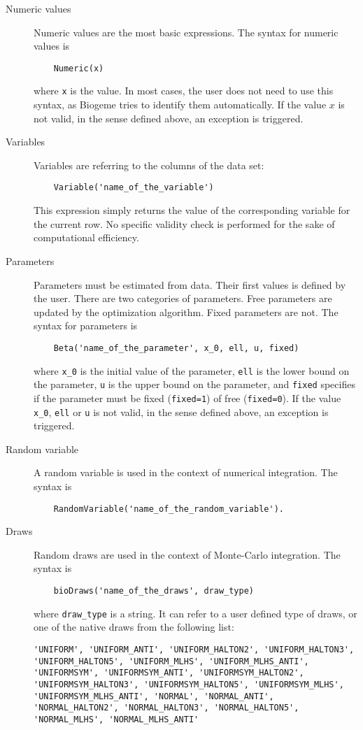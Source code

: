 \documentclass[12pt,a4paper]{article}
\begin{document}
\begin{description}
\item[Numeric values] Numeric values are the most basic expressions. The syntax for numeric values is
  \begin{lstlisting}
    Numeric(x)
  \end{lstlisting}
  where \lstinline+x+ is the value. In most cases, the user does not need to use this syntax, as Biogeme tries to identify them automatically.
  If the value $x$ is not valid, in the sense defined above, an exception is triggered.
\item[Variables] Variables are referring to the columns of the data set:
  \begin{lstlisting}
    Variable('name_of_the_variable')
  \end{lstlisting}
  This expression simply returns the value of the corresponding variable for the current row. No specific validity check is performed for the sake of computational efficiency.
\item[Parameters] Parameters must be estimated from data. Their first values is defined by the user. There are two categories of parameters. Free parameters are updated by the optimization algorithm.
  Fixed parameters are not.
  The syntax for parameters is
  \begin{lstlisting}
    Beta('name_of_the_parameter', x_0, ell, u, fixed)
  \end{lstlisting}
  where \lstinline+x_0+ is the initial value of the parameter,
  \lstinline+ell+ is the lower bound on the parameter, \lstinline+u+ is the upper bound on the parameter, and \lstinline+fixed+ specifies if the parameter must be fixed (\lstinline+fixed=1+) of free (\lstinline+fixed=0+).
  If the value \lstinline+x_0+, \lstinline+ell+ or \lstinline+u+  is not valid, in the sense defined above, an exception is triggered.
\item[Random variable] A random variable is used in the context of numerical integration.
  The syntax is
  \begin{lstlisting}
    RandomVariable('name_of_the_random_variable').
  \end{lstlisting}
\item[Draws] Random draws are used in the context of Monte-Carlo integration. 
  The syntax is
  \begin{lstlisting}
    bioDraws('name_of_the_draws', draw_type)
  \end{lstlisting}
  where \lstinline+draw_type+ is a string. It can refer to  a user defined type of draws, or one of the native draws from the following list:
  \begin{lstlisting}
'UNIFORM', 'UNIFORM_ANTI', 'UNIFORM_HALTON2', 'UNIFORM_HALTON3', 'UNIFORM_HALTON5', 'UNIFORM_MLHS', 'UNIFORM_MLHS_ANTI', 'UNIFORMSYM', 'UNIFORMSYM_ANTI', 'UNIFORMSYM_HALTON2', 'UNIFORMSYM_HALTON3', 'UNIFORMSYM_HALTON5', 'UNIFORMSYM_MLHS', 'UNIFORMSYM_MLHS_ANTI', 'NORMAL', 'NORMAL_ANTI', 'NORMAL_HALTON2', 'NORMAL_HALTON3', 'NORMAL_HALTON5', 'NORMAL_MLHS', 'NORMAL_MLHS_ANTI'
  \end{lstlisting}
\end{description}
\end{document}
